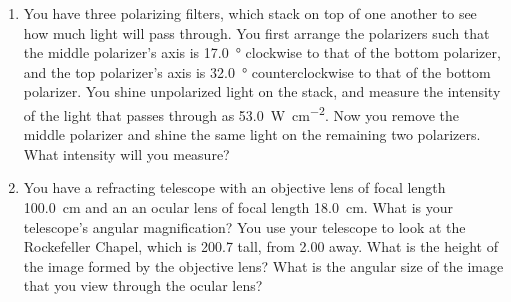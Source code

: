 \documentclass[11pt]{article}
\begin{document}
\begin{enumerate}

\newcommand{\angleq}{\SI{17.0}{\degree}}
\newcommand{\anglew}{\SI{32.0}{\degree}}
\newcommand{\inten}{\SI{53.0}{\watt\per\square\cm}}


\item You have three polarizing filters, which stack on top of one another to see how much light will pass through.  You first arrange the polarizers such that the middle polarizer's axis is {\angleq} clockwise to that of the bottom polarizer, and the top polarizer's axis is {\anglew} counterclockwise to that of the bottom polarizer.  You shine unpolarized light on the stack, and measure the intensity of the light that passes through as {\inten}.  Now you remove the middle polarizer and shine the same light on the remaining two polarizers.  What intensity will you measure?





\newcommand{\objf}{\SI{100.0}{\cm}}
\newcommand{\ocuf}{\SI{18.0}{\cm}}
\newcommand{\bheight}{\SI{200.7}{\foot}}
\newcommand{\bdist}{\SI{2.00}{\mile}}

\item You have a refracting telescope with an objective lens of focal length {\objf} and an an ocular lens of focal length {\ocuf}.  What is your telescope's angular magnification?  You use your telescope to look at the Rockefeller Chapel, which is {\bheight} tall, from {\bdist} away.  What is the height of the image formed by the objective lens?  What is the angular size of the image that you view through the ocular lens?

\end{enumerate}
\end{document}

